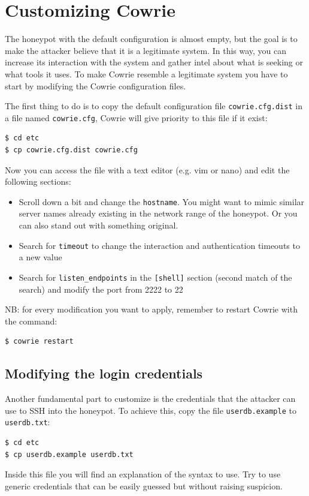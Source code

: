 \documentclass[epsfig,a4paper,11pt,titlepage,oneside,openany]{book}
\begin{document}
\section{Customizing Cowrie}
The honeypot with the default configuration is almost empty, but the goal is to make the attacker believe that it is a legitimate system. In this way, you can increase its interaction with the system and gather intel about what is seeking or what tools it uses. To make Cowrie resemble a legitimate system you have to start by modifying the Cowrie configuration files.

The first thing to do is to copy the default configuration file \texttt{cowrie.cfg.dist} in a file named \texttt{cowrie.cfg}, Cowrie will give priority to this file if it exist:
\begin{lstlisting}[language=bash]
$ cd etc
$ cp cowrie.cfg.dist cowrie.cfg
\end{lstlisting}
Now you can access the file with a text editor (e.g. vim or nano) and edit the following sections:
\begin{itemize}
\item Scroll down a bit and change the \texttt{hostname}. You might want to mimic similar server names already existing in the network range of the honeypot. Or you can also stand out with something original.
\item Search for \texttt{timeout} to change the interaction and authentication timeouts to a new value
\item Search for \texttt{listen\_endpoints} in the \texttt{[shell]} section (second match of the search) and modify the port from 2222 to 22
\end{itemize}

\noindent NB: for every modification you want to apply, remember to restart Cowrie with the command:

\begin{lstlisting}[language=bash]
$ cowrie restart
\end{lstlisting}

\subsection{Modifying the login credentials}
\label{sub:login}
Another fundamental part to customize is the credentials that the attacker can use to SSH into the honeypot. To achieve this, copy the file \texttt{userdb.example} to \texttt{userdb.txt}:
\begin{lstlisting}[language=bash]
$ cd etc
$ cp userdb.example userdb.txt
\end{lstlisting}
Inside this file you will find an explanation of the syntax to use.
Try to use generic credentials that can be easily guessed but without raising suspicion.
\end{document}
